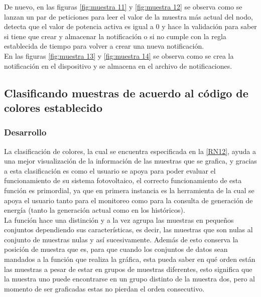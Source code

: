 De nuevo, en las figuras \ref{fig:muestra 11} y \ref{fig:muestra 12} se observa como se lanzan un par de peticiones para leer el valor de la muestra más actual del nodo, detecta que el valor de potencia activa es igual a 0 y hace la validación para saber si tiene que crear y almacenar la notificación o si no cumple con la regla establecida de tiempo para volver a crear una nueva notificación.
\\ \newline
En las figuras \ref{fig:muestra 13} y \ref{fig:muestra 14} se observa como se crea la notificación en el dispositivo y se almacena en el archivo de notificaciones.





\subsection{Clasificando muestras de acuerdo al código de colores establecido}

\subsubsection{Desarrollo}
La clasificación de colores, la cual se encuentra especificada en la \ref{RN12}, ayuda a una mejor visualización de la información de las muestras que se grafica, y gracias a esta clasificación es como el usuario se apoya para poder evaluar el funcionamiento de su sistema fotovoltaico, el correcto funcionamiento de esta función es primordial, ya que en primera instancia es la herramienta de la cual se apoya el usuario tanto para el monitoreo como para la consulta de generación de energía (tanto la generación actual como en los históricos). \\ \newline
La función hace una distinción y a la vez agrupa las muestras en pequeños conjuntos dependiendo sus características, es decir, las muestras que son nulas al conjunto de muestras nulas y así sucesivamente. Además de esto conserva la posición de muestra que es, para que cuando los conjuntos de datos sean mandados a la función que realiza la gráfica, esta pueda saber en qué orden están las muestras a pesar de estar en grupos de muestras diferentes, esto significa que la muestra uno puede encontrarse en un grupo distinto de la muestra dos, pero al momento de ser graficadas estas no pierdan el orden consecutivo.\\ \newline

